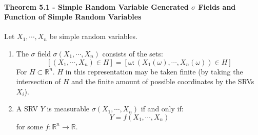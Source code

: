 \documentclass[12pt,a4paper]{article}
\newcommand{\1}[1]{\mathbbm{1}\left\{ #1 \right\}}
\newcommand{\R}{\mathbb{R}}
\begin{document}
\paragraph{Theorem 5.1 - Simple Random Variable Generated $\sigma$ Fields and Function of Simple Random Variables} Let $X_1, \cdots, X_n$ be simple random variables.
\begin{enumerate}
	\item The $\sigma$ field $\sigma(X_1, \cdots, X_n)$ consists of the sets:
	$$
		\left[(X_1, \cdots, X_n) \in H\right] =
		\left[\omega : (X_1(\omega), \cdots, X_n(\omega)) \in H\right]
	$$
	For $H \subset \R^n$. $H$ in this representation may be taken finite (by taking the intersection of $H$ and the finite amount of possible coordinates by the SRVs $X_i$).
	
	\item A SRV $Y$ is measurable $\sigma(X_1, \cdots, X_n)$ if and only if:
	$$
		Y = f(X_1, \cdots, X_n)
	$$
	for some $f: \R^n \to \R$. 
\end{enumerate}
\end{document}
